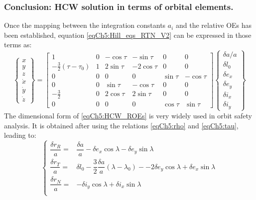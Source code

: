 		\subsubsection{Conclusion: HCW solution in terms of orbital elements.}
		\indent Once the mapping between the integration constants $a_i$ and the relative OEs has been established, equation \eqref{eqCh5:Hill_eqs_RTN_V2} can be expressed in those terms as:
		\begin{equation}
		\left\{
		\begin{array}{c}
		x\\
		y\\
		z\\
		\dot{x}\\
		\dot{y}\\
		\dot{z}
		\end{array}\right\}
		= 
		\left[ \begin{array}{cccccc}
		1 								& 0	& -\cos\tau & -\sin\tau 	& 0 		& 0 \\
		-\frac{3}{2}(\tau - \tau_0) 	& 1 & 2\sin\tau & -2\cos\tau 	& 0 		& 0\\
		0 								& 0 & 0 		& 0 			& \sin\tau 	& -\cos\tau \\
		0 								& 0 & \sin\tau 	& -\cos\tau 	& 0 		& 0\\
		-\frac{3}{2}					& 0 & 2\cos\tau & 2\sin \tau 	& 0 		& 0\\
		0 								& 0 & 0 		& 0 			& \cos\tau 	& \sin \tau
		\end{array}\right]
		\left\{
		\begin{array}{c}
		\delta a / a\\
		\delta l_0\\
		\delta e_x\\
		\delta e_y\\
		\delta i_x\\
		\delta i_y
		\end{array}\right\}
		\label{eqCh5:HCW_ROEs}
		\end{equation}
		\indent The dimensional form of \eqref{eqCh5:HCW_ROEs} is very widely used in orbit safety analysis. It is obtained after using the relations \eqref{eqCh5:rho} and \eqref{eqCh5:tau}, leading to:
		\begin{equation}
		\left\{ \begin{array}{ll}
		\dfrac{\delta r_R}{a} = & \dfrac{\delta a}{a} - \delta e_x \cos\lambda - \delta e_y \sin\lambda \\[1.2 em]
		\dfrac{\delta r_T}{a} = & \delta l_0 - \dfrac{3}{2}\dfrac{\delta a}{a}(\lambda - \lambda_0) - -2 \delta e_y \cos\lambda + \delta e_x \sin\lambda \\[1.2 em]
		\dfrac{\delta r_N}{a} = & - \delta i_y \cos\lambda + \delta i_x \sin\lambda \\
		\end{array}\right.
		\label{eqCh5:HCW_RTN}
		\end{equation}
